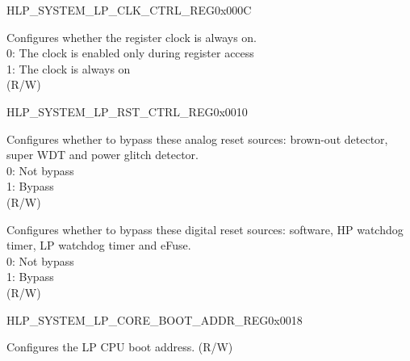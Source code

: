 \begin{register}{H}{LP\_SYSTEM\_LP\_CLK\_CTRL\_REG}{0x000C}\label{regdesc:LPSYSTEMLPCLKCTRLREG}
%
%
\regnewline%
\begin{regdesc}\begin{reglist}
\label{fielddesc:LPSYSTEMCLKEN}\item [LP\_SYSTEM\_CLK\_EN] Configures whether the register clock is always on.\\
0: The clock is enabled only during register access\\
1: The clock is always on\\
(R/W)
\end{reglist}\end{regdesc}
\end{register}


\begin{register}{H}{LP\_SYSTEM\_LP\_RST\_CTRL\_REG}{0x0010}\label{regdesc:LPSYSTEMLPRSTCTRLREG}
%
%
%
\regnewline%
\begin{regdesc}\begin{reglist}
\label{fielddesc:LPSYSTEMANARSTBYPASS}\item [LP\_SYSTEM\_ANA\_RST\_BYPASS] Configures whether to bypass these analog reset sources: brown-out detector, super WDT and power glitch detector.\\
0: Not bypass\\
1: Bypass\\
(R/W)
\label{fielddesc:LPSYSTEMSYSRSTBYPASS}\item [LP\_SYSTEM\_SYS\_RST\_BYPASS] Configures whether to bypass these digital reset sources: software, HP watchdog timer, LP watchdog timer and eFuse.\\
0: Not bypass\\
1: Bypass\\
(R/W)
\end{reglist}\end{regdesc}
\end{register}


\begin{register}{H}{LP\_SYSTEM\_LP\_CORE\_BOOT\_ADDR\_REG}{0x0018}\label{regdesc:LPSYSTEMLPCOREBOOTADDRREG}
%
\regnewline%
\begin{regdesc}\begin{reglist}
\label{fielddesc:LPSYSTEMLPCPUBOOTADDR}\item [LP\_SYSTEM\_LP\_CPU\_BOOT\_ADDR] Configures the LP CPU boot address. (R/W)
\end{reglist}\end{regdesc}
\end{register}



